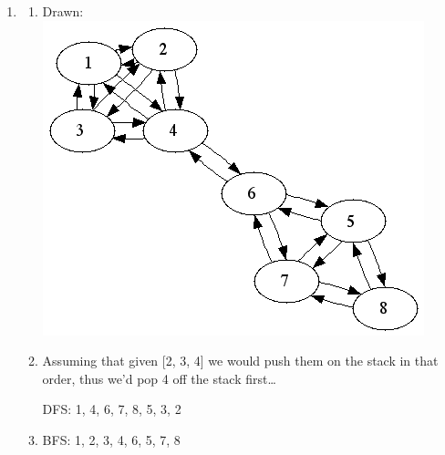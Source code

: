 \documentclass[12pt]{chmullighw}
\begin{document}
\begin{enumerate}
\begin{enumerate}

\end{enumerate}

\item 
\begin{enumerate}
\item Drawn: \includegraphics[width=0.6\linewidth]{q7.png}

\item Assuming that given [2, 3, 4] we would push them on the stack in that order, thus we'd pop 4 off the stack first\ldots

DFS: 1, 4, 6, 7, 8, 5, 3, 2

\item BFS: 1, 2, 3, 4, 6, 5, 7, 8

\end{enumerate}

\end{enumerate} %
\end{document}

